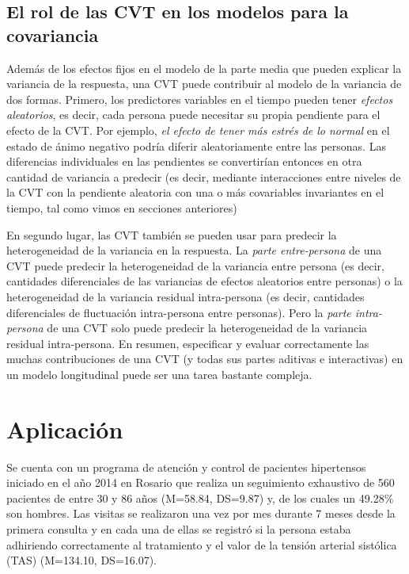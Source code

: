 \documentclass[spanish]{article}
\numberwithin{figure}{subsection}
\numberwithin{equation}{subsection}
\numberwithin{table}{subsection}
\def\npatients{560}
\begin{document}

\subsection{El rol de las CVT en los modelos para la covariancia}

Además de los efectos fijos en el modelo de la parte media que pueden explicar
la variancia de la respuesta, una CVT puede contribuir al modelo de la
variancia de dos formas. Primero, los predictores variables en el tiempo pueden
tener \textit{efectos aleatorios}, es decir, cada persona puede necesitar su
propia pendiente para el efecto de la CVT. Por ejemplo, \textit{el efecto de
tener más estrés de lo normal} en el estado de ánimo negativo podría diferir
aleatoriamente entre las personas. Las diferencias individuales en las
pendientes se convertirían entonces en otra cantidad de variancia a predecir
(es decir, mediante interacciones entre niveles de la CVT con la pendiente
aleatoria con una o más covariables invariantes en el tiempo, tal como vimos en
secciones anteriores)

En segundo lugar, las CVT también se pueden usar para predecir la
heterogeneidad de la variancia en la respuesta. La \textit{parte entre-persona}
de una CVT puede predecir la heterogeneidad de la variancia entre persona (es
decir, cantidades diferenciales de las variancias de efectos aleatorios entre
personas) o la heterogeneidad de la variancia residual intra-persona (es decir,
cantidades diferenciales de fluctuación intra-persona entre personas). Pero la
\textit{parte intra-persona} de una CVT solo puede predecir la heterogeneidad
de la variancia residual intra-persona. En resumen, especificar y evaluar
correctamente las muchas contribuciones de una CVT (y todas sus partes aditivas
e interactivas) en un modelo longitudinal puede ser una tarea bastante
compleja.



\newpage
\section{Aplicación}

Se cuenta con un programa de atención y control de pacientes hipertensos
iniciado en el año 2014 en Rosario que realiza un seguimiento exhaustivo de
\npatients{} pacientes de entre 30 y 86 años (M=58.84, DS=9.87) y, de los
cuales un 49.28\% son hombres. Las visitas se realizaron una vez por mes
durante 7 meses desde la primera consulta y en cada una de ellas se registró si
la persona estaba adhiriendo correctamente al tratamiento y el valor de la
tensión arterial sistólica (TAS) (M=134.10, DS=16.07).
\end{document}
